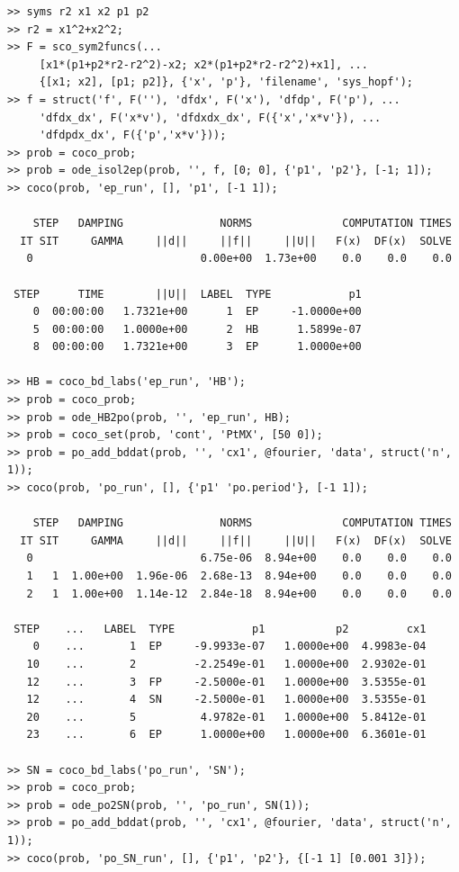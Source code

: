 \begin{lstlisting}[language=coco-highlight,frame=lines]
>> syms r2 x1 x2 p1 p2
>> r2 = x1^2+x2^2;
>> F = sco_sym2funcs(...
     [x1*(p1+p2*r2-r2^2)-x2; x2*(p1+p2*r2-r2^2)+x1], ...
     {[x1; x2], [p1; p2]}, {'x', 'p'}, 'filename', 'sys_hopf');
>> f = struct('f', F(''), 'dfdx', F('x'), 'dfdp', F('p'), ...
     'dfdx_dx', F('x*v'), 'dfdxdx_dx', F({'x','x*v'}), ...
     'dfdpdx_dx', F({'p','x*v'}));
>> prob = coco_prob;
>> prob = ode_isol2ep(prob, '', f, [0; 0], {'p1', 'p2'}, [-1; 1]);
>> coco(prob, 'ep_run', [], 'p1', [-1 1]);

    STEP   DAMPING               NORMS              COMPUTATION TIMES
  IT SIT     GAMMA     ||d||     ||f||     ||U||   F(x)  DF(x)  SOLVE
   0                          0.00e+00  1.73e+00    0.0    0.0    0.0

 STEP      TIME        ||U||  LABEL  TYPE            p1
    0  00:00:00   1.7321e+00      1  EP     -1.0000e+00
    5  00:00:00   1.0000e+00      2  HB      1.5899e-07
    8  00:00:00   1.7321e+00      3  EP      1.0000e+00
    
>> HB = coco_bd_labs('ep_run', 'HB');
>> prob = coco_prob;
>> prob = ode_HB2po(prob, '', 'ep_run', HB);
>> prob = coco_set(prob, 'cont', 'PtMX', [50 0]);
>> prob = po_add_bddat(prob, '', 'cx1', @fourier, 'data', struct('n', 1));
>> coco(prob, 'po_run', [], {'p1' 'po.period'}, [-1 1]);

    STEP   DAMPING               NORMS              COMPUTATION TIMES
  IT SIT     GAMMA     ||d||     ||f||     ||U||   F(x)  DF(x)  SOLVE
   0                          6.75e-06  8.94e+00    0.0    0.0    0.0
   1   1  1.00e+00  1.96e-06  2.68e-13  8.94e+00    0.0    0.0    0.0
   2   1  1.00e+00  1.14e-12  2.84e-18  8.94e+00    0.0    0.0    0.0

 STEP    ...   LABEL  TYPE            p1           p2         cx1
    0    ...       1  EP     -9.9933e-07   1.0000e+00  4.9983e-04
   10    ...       2         -2.2549e-01   1.0000e+00  2.9302e-01
   12    ...       3  FP     -2.5000e-01   1.0000e+00  3.5355e-01
   12    ...       4  SN     -2.5000e-01   1.0000e+00  3.5355e-01
   20    ...       5          4.9782e-01   1.0000e+00  5.8412e-01
   23    ...       6  EP      1.0000e+00   1.0000e+00  6.3601e-01
   
>> SN = coco_bd_labs('po_run', 'SN');
>> prob = coco_prob;
>> prob = ode_po2SN(prob, '', 'po_run', SN(1));
>> prob = po_add_bddat(prob, '', 'cx1', @fourier, 'data', struct('n', 1));
>> coco(prob, 'po_SN_run', [], {'p1', 'p2'}, {[-1 1] [0.001 3]});


\end{lstlisting}
